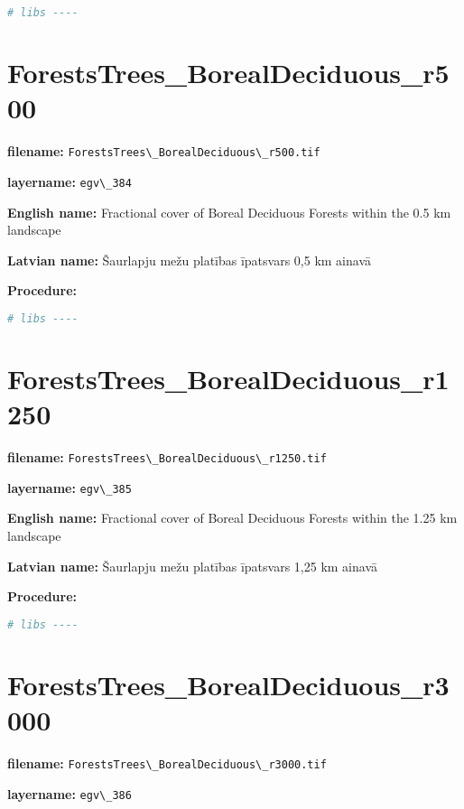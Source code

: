 \documentclass[
]{book}
\newcommand{\passthrough}[1]{#1}
\begin{document}
\begin{lstlisting}[language=R]
# libs ----
\end{lstlisting}

\section{ForestsTrees\_BorealDeciduous\_r500}\label{ch06.384}

\textbf{filename:} \passthrough{\lstinline!ForestsTrees\_BorealDeciduous\_r500.tif!}

\textbf{layername:} \passthrough{\lstinline!egv\_384!}

\textbf{English name:} Fractional cover of Boreal Deciduous Forests within the 0.5 km landscape

\textbf{Latvian name:} Šaurlapju mežu platības īpatsvars 0,5 km ainavā

\textbf{Procedure:}

\begin{lstlisting}[language=R]
# libs ----
\end{lstlisting}

\section{ForestsTrees\_BorealDeciduous\_r1250}\label{ch06.385}

\textbf{filename:} \passthrough{\lstinline!ForestsTrees\_BorealDeciduous\_r1250.tif!}

\textbf{layername:} \passthrough{\lstinline!egv\_385!}

\textbf{English name:} Fractional cover of Boreal Deciduous Forests within the 1.25 km landscape

\textbf{Latvian name:} Šaurlapju mežu platības īpatsvars 1,25 km ainavā

\textbf{Procedure:}

\begin{lstlisting}[language=R]
# libs ----
\end{lstlisting}

\section{ForestsTrees\_BorealDeciduous\_r3000}\label{ch06.386}

\textbf{filename:} \passthrough{\lstinline!ForestsTrees\_BorealDeciduous\_r3000.tif!}

\textbf{layername:} \passthrough{\lstinline!egv\_386!}
\end{document}
